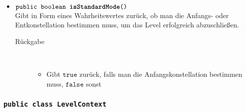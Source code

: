 \begin{description}
\begin{itemize}
		\item $\texttt{public boolean \textbf{isStandardMode}()}$ \\ Gibt in Form eines Wahrheitswertes zurück, ob man die Anfangs- oder Entkonstellation bestimmen muss, um das Level erfolgreich abzuschließen.
		\begin{description}
			\item[Rückgabe] \hfill \\
			\vspace{-.8cm}
			\begin{itemize}
				\item Gibt $\texttt{true}$ zurück, falls man die Anfangskonstellation bestimmen muss, $\texttt{false}$ sonst
			\end{itemize}
			\end{description}

		\end{itemize}
	\end{description}
	
	
	
	

\subsubsection{\normalfont \texttt{public class \textbf{LevelContext}}}


